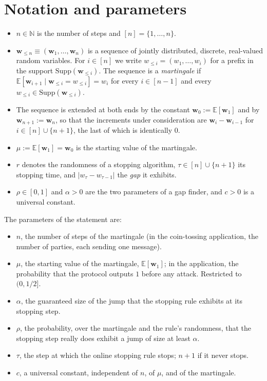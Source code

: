 \documentclass{aicr-conjecture}
\newcommand{\wv}{\mathbf{w}}
\newcommand{\Supp}{\mathrm{Supp}}
\newcommand{\Ex}{\mathbb{E}}
\newcommand{\Nat}{\mathbb{N}}
\begin{document}
\section{Notation and parameters}\label{sec:notation}

\begin{itemize}
\item $n \in \Nat$ is the number of steps and $[n] = \{1,\dots,n\}$.
\item $\wv_{\le n} \equiv (\wv_1,\dots,\wv_n)$ is a sequence of jointly
  distributed, discrete, real-valued random variables. For $i \in [n]$
  we write $w_{\le i} = (w_1,\dots,w_i)$ for a prefix in the support
  $\Supp(\wv_{\le i})$. The sequence is a \emph{martingale} if
  $\Ex[\wv_{i+1} \mid \wv_{\le i} = w_{\le i}] = w_i$ for every
  $i \in [n-1]$ and every $w_{\le i} \in \Supp(\wv_{\le i})$.
\item The sequence is extended at both ends by the constant
  $\wv_0 := \Ex[\wv_1]$ and by $\wv_{n+1} := \wv_n$, so that the
  increments under consideration are $\wv_i - \wv_{i-1}$ for
  $i \in [n] \cup \{n+1\}$, the last of which is identically $0$.
\item $\mu := \Ex[\wv_1] = \wv_0$ is the starting value of the
  martingale.
\item $r$ denotes the randomness of a stopping algorithm,
  $\tau \in [n] \cup \{n+1\}$ its stopping time, and
  $|w_\tau - w_{\tau-1}|$ the \emph{gap} it exhibits.
\item $\rho \in [0,1]$ and $\alpha > 0$ are the two parameters of a gap
  finder, and $c > 0$ is a universal constant.
\end{itemize}

The parameters of the statement are:
\begin{itemize}
\item $n$, the number of steps of the martingale (in the coin-tossing
  application, the number of parties, each sending one message).
\item $\mu$, the starting value of the martingale, $\Ex[\wv_1]$; in the
  application, the probability that the protocol outputs $1$ before any
  attack. Restricted to $(0,1/2]$.
\item $\alpha$, the guaranteed size of the jump that the stopping rule
  exhibits at its stopping step.
\item $\rho$, the probability, over the martingale and the rule's
  randomness, that the stopping step really does exhibit a jump of size
  at least $\alpha$.
\item $\tau$, the step at which the online stopping rule stops; $n+1$ if
  it never stops.
\item $c$, a universal constant, independent of $n$, of $\mu$, and of
  the martingale.
\end{itemize}
\end{document}
